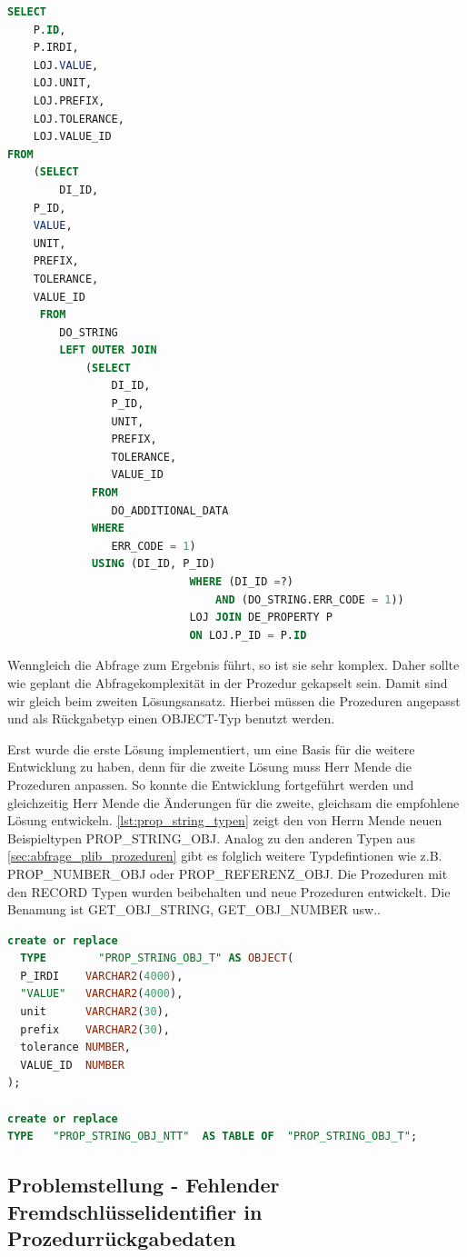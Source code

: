 \begin{lstlisting}[caption=SELECT-Abfrage für String-Properties aus den Prozeduren, language=sql, label=lst:select_string]
SELECT 
    P.ID, 
    P.IRDI, 
    LOJ.VALUE, 
    LOJ.UNIT, 
    LOJ.PREFIX, 
    LOJ.TOLERANCE, 
    LOJ.VALUE_ID 
FROM 
    (SELECT 
    	DI_ID, 
	P_ID, 
	VALUE, 
	UNIT, 
	PREFIX, 
	TOLERANCE, 
	VALUE_ID
     FROM 
     	DO_STRING 
		LEFT OUTER JOIN 
			(SELECT 
				DI_ID, 
				P_ID, 
				UNIT, 
				PREFIX, 
				TOLERANCE, 
				VALUE_ID
			 FROM 
			 	DO_ADDITIONAL_DATA 
			 WHERE 
			 	ERR_CODE = 1)
			 USING (DI_ID, P_ID)
                          	WHERE (DI_ID =?) 
                          		AND (DO_STRING.ERR_CODE = 1))
                          	LOJ JOIN DE_PROPERTY P  
                          	ON LOJ.P_ID = P.ID
\end{lstlisting}

Wenngleich die Abfrage zum Ergebnis führt, so ist sie sehr komplex. Daher sollte wie geplant die Abfragekomplexität in der Prozedur gekapselt sein. Damit sind wir gleich beim zweiten Lösungsansatz. Hierbei müssen die Prozeduren angepasst und als Rückgabetyp einen OBJECT-Typ benutzt werden. 

Erst wurde die erste Lösung implementiert, um eine Basis für die weitere Entwicklung zu haben, denn für die zweite Lösung muss Herr Mende die Prozeduren anpassen. So konnte die Entwicklung fortgeführt werden und gleichzeitig Herr Mende die Änderungen für die zweite, gleichsam die empfohlene Lösung entwickeln. \autoref{lst:prop_string_typen} zeigt den von Herrn Mende neuen Beispieltypen PROP\_STRING\_OBJ. Analog zu den anderen Typen aus \autoref{sec:abfrage_plib_prozeduren} gibt es folglich weitere Typdefintionen wie z.B. PROP\_NUMBER\_OBJ oder PROP\_REFERENZ\_OBJ. 
Die Prozeduren mit den RECORD Typen wurden beibehalten und neue Prozeduren entwickelt. Die Benamung ist GET\_OBJ\_STRING, GET\_OBJ\_NUMBER usw..

\begin{lstlisting}[caption=PROP\_STRING\_OBJ Typen, language=sql, label=lst:prop_string_typen]
create or replace
  TYPE        "PROP_STRING_OBJ_T" AS OBJECT(
  P_IRDI    VARCHAR2(4000),
  "VALUE"   VARCHAR2(4000),
  unit      VARCHAR2(30),
  prefix    VARCHAR2(30),
  tolerance NUMBER,
  VALUE_ID  NUMBER
);

create or replace
TYPE   "PROP_STRING_OBJ_NTT"  AS TABLE OF  "PROP_STRING_OBJ_T";
\end{lstlisting}

\subsection{Problemstellung - Fehlender Fremdschlüsselidentifier in Prozedurrückgabedaten}

